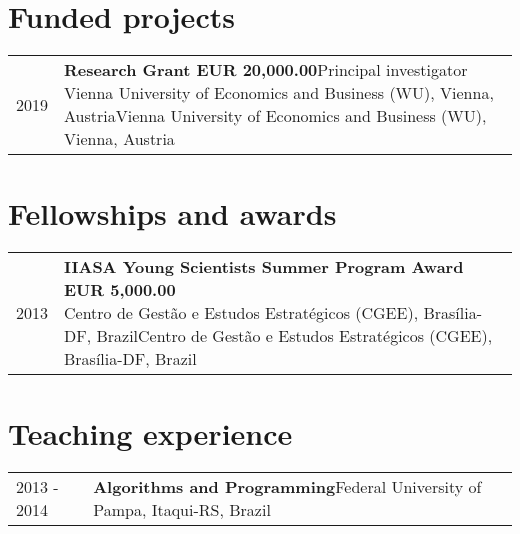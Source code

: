 \documentclass[10pt,a4paper,]{article}
\makeatletter
\def\detaileditem#1#2#3#4#5{
#2 & \parbox[t]{0.85\textwidth}{%
      \textbf{#1}\hfill{\footnotesize #3}\\
      \ifx#4\empty\else#4\par\fi%
      \ifx#5\empty\else{%
        \vspace{0.1cm}\begin{minipage}{0.7\textwidth}%
        \begin{itemize}#5\end{itemize}%
        \end{minipage}}\fi%
      \vspace{\parsep}}\\}
\def\detailedsection#1{\begin{longtable}{@{\extracolsep{\fill}}ll}#1\end{longtable}}
\makeatother
\begin{document}
\hypertarget{funded-projects}{%
\section{Funded projects}\label{funded-projects}}

\detailedsection{\detaileditem{Research Grant EUR 20,000.00}{2019}{Principal investigator}{Vienna University of Economics and Business (WU), Vienna, Austria}{\empty}\detaileditem{Educational Project Grant BRL 7,200.00}{2013}{Principal investigator}{Universidade Federal do Pampa (UNIPAMPA), Itaqui, RS, Brazil}{\empty}}

\hypertarget{fellowships-and-awards}{%
\section{Fellowships and awards}\label{fellowships-and-awards}}

\detailedsection{\detaileditem{IIASA Young Scientists Summer Program Award EUR 5,000.00}{2013}{}{Centro de Gestão e Estudos Estratégicos (CGEE), Brasília-DF, Brazil}{\empty}\detaileditem{Master's Full Scholarship Award BRL 28,800.00}{2009}{}{Coordination for the Improvement of Higher Education Personnel (CAPES), Brasília-DF, Brazil}{\empty}\detaileditem{Scholarship Award BRL 6,000.00}{2008}{}{Research Support Foundation of Rio Grande do Sul (FAPERGS), Porto Alegre-RS, Brazil}{\empty}\detaileditem{Scholarship Award BRL 4,800.00}{2007}{}{Franciscan University (UFN), Santa Maria-RS, Brazil}{\empty}\detaileditem{Scholarship Award BRL 4,800.00}{2006}{}{Franciscan University (UFN), Santa Maria-RS, Brazil}{\empty}\detaileditem{Scholarship Award BRL 3,200.00}{2004}{}{Franciscan University (UFN), Santa Maria-RS, Brazil}{\empty}}

\hypertarget{teaching-experience}{%
\section{Teaching experience}\label{teaching-experience}}

\detailedsection{\detaileditem{Algorithms and Programming}{2013 - 2014}{Federal University of Pampa, Itaqui-RS, Brazil}{}{\empty}\detaileditem{Introduction to Informatics}{2013 - 2014}{Federal University of Pampa, Itaqui-RS, Brazil}{}{\empty}\detaileditem{Numerical Analysis}{2013 - 2014}{Federal University of Pampa, Itaqui-RS, Brazil}{}{\empty}\detaileditem{Environmental Management}{2012 - 2012}{Federal University of Pampa, Itaqui-RS, Brazil}{}{\empty}\detaileditem{Informatics}{2012 - 2013}{Federal University of Pampa, Itaqui-RS, Brazil}{}{\empty}\detaileditem{Introduction to Programming}{2012 - 2012}{Federal University of Pampa, Itaqui-RS, Brazil}{}{\empty}\detaileditem{Numerical Analysis}{2010 - 2010}{Federal University of Juiz de Fora, Juiz de Fora-MG, Brazil}{}{\empty}\detaileditem{Programming Laboratory}{2009 - 2010}{Federal University of Juiz de Fora, Juiz de Fora-MG, Brazil}{}{\empty}}
\end{document}
